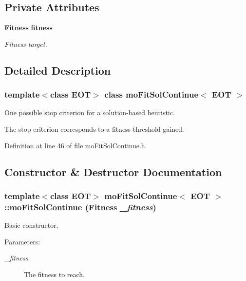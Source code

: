 \subsection*{Private Attributes}
\begin{CompactItemize}
\item 
{\bf Fitness} {\bf fitness}\label{classmo_fit_sol_continue_r0}

\begin{CompactList}\small\item\em Fitness target. \item\end{CompactList}\end{CompactItemize}


\subsection{Detailed Description}
\subsubsection*{template$<$class EOT$>$ class mo\-Fit\-Sol\-Continue$<$ EOT $>$}

One possible stop criterion for a solution-based heuristic. 

The stop criterion corresponds to a fitness threshold gained. 



Definition at line 46 of file mo\-Fit\-Sol\-Continue.h.

\subsection{Constructor \& Destructor Documentation}
\subsubsection{\setlength{\rightskip}{0pt plus 5cm}template$<$class EOT$>$ {\bf mo\-Fit\-Sol\-Continue}$<$ EOT $>$::{\bf mo\-Fit\-Sol\-Continue} ({\bf Fitness} {\em \_\-fitness})\hspace{0.3cm}{\tt  [inline]}}\label{classmo_fit_sol_continue_a0}


Basic constructor. 

\begin{Desc}
\item[Parameters:]
\begin{description}
\item[{\em \_\-fitness}]The fitness to reach. \end{description}
\end{Desc}


